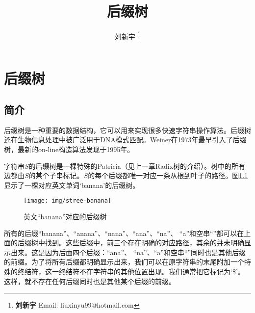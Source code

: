 \documentclass{ctexart}
\begin{document}


\title{后缀树}

\author{刘新宇
\thanks{{\bfseries 刘新宇 } \newline
  Email: liuxinyu99@hotmail.com \newline}
  }

\maketitle
\fi


\ifx\wholebook\relax
\chapter{后缀树}
\fi


\section{简介}
\label{introduction}

后缀树是一种重要的数据结构，它可以用来实现很多快速字符串操作算法\cite{wiki-suffix-tree}。后缀树还在生物信息处理中被广泛用于DNA模式匹配\cite{ukkonen-presentation}。Weiner在1973年最早引入了后缀树\cite{weiner73}，最新的on-line构造算法发现于1995年\cite{ukkonen95}。

字符串$S$的后缀树是一棵特殊的Patricia（见上一章Radix树的介绍）。树中的所有边都由$S$的某个子串标记。$S$的每个后缀都唯一对应一条从根到叶子的路径。图\cref{fig:stree-banana}显示了一棵对应英文单词‘banana’的后缀树。

\begin{figure}[htbp]
  \centering
  \texttt{[image: img/stree-banana]}
  \caption{英文“banana”对应的后缀树} \label{fig:stree-banana}
\end{figure}

所有的后缀“banana”、“anana”、“nana”、“ana”、“na”、
“a”和空串“”都可以在上面的后缀树中找到。这些后缀中，前三个存在明确的对应路径，其余的并未明确显示出来。这是因为后面四个后缀：“ana”、
“na”、“a”和空串“”同时也是其他后缀的前缀。为了将所有后缀都明确显示出来，我们可以在原字符串的末尾附加一个特殊的终结符，这一终结符不在字符串的其他位置出现。我们通常把它标记为‘\$’。这样，就不存在任何后缀同时也是其他某个后缀的前缀。
\end{document}
